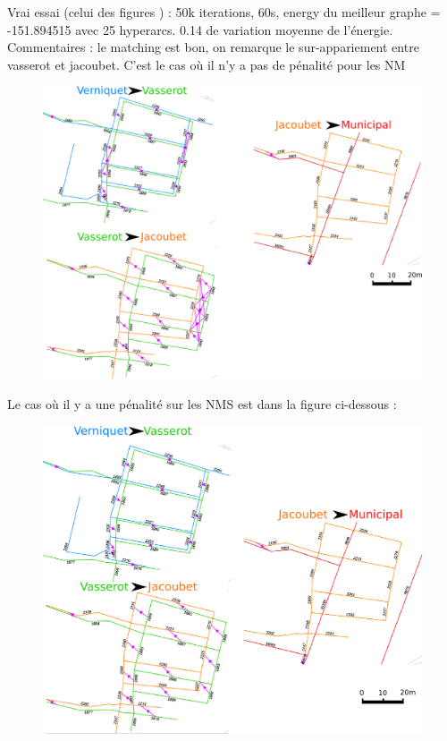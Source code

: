 \documentclass[a4paper,12pt]{article}
\begin{document}
Vrai essai (celui des figures ) : 50k iterations, 60s, energy du meilleur graphe = -151.894515 avec 25 hyperarcs. 0.14 de variation moyenne de l'énergie. 
\\
Commentaires : le matching est bon, on remarque le sur-appariement entre vasserot et jacoubet. C'est le cas où il n'y a pas de pénalité pour les NM
\begin{figure}
\includegraphics[angle = 90, width=1\textwidth]{./images/illus_graphs/graphe_troncons_greneta.png}
\end{figure}

Le cas où il y  a une pénalité sur les NMS est dans la figure ci-dessous :
\begin{figure}
\includegraphics[angle = 90, width=1\textwidth]{./images/illus_graphs/graphe_troncons_greneta_nmpenalty.png}
\end{figure}
\end{document}
